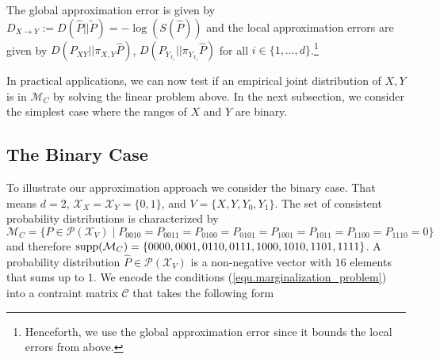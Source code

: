 \documentclass[letterpaper]{article}
\newcommand{\kC}{\mathcal{C}}   %
\newcommand{\kM}{\mathcal{M}}   %
\newcommand{\kP}{\mathcal{P}}   %
\newcommand{\kX}{\mathcal{X}}   %
\newcommand{\supp}{{\rm supp}}
\begin{document}
The global approximation error is given by $D_{X \rightarrow Y} := D(\hat P || \tilde P) = -\log(S(\hat P))$ and the local approximation errors are given by $D(P_{XY} || \pi_{X,Y} \hat P)$, $D(P_{Y_{x_i}} || \pi_{Y_{x_i}} \hat P)$ for all $i \in \{1, \ldots, d\}$.\footnote{Henceforth, we use the global approximation error since it bounds the local errors from above.}

In practical applications, we can now test if an empirical joint distribution of $X, Y$ is in $\kM_C$ by solving the linear problem above. In the next subsection, we consider the simplest case where the ranges of $X$ and $Y$ are binary.

\subsection{The Binary Case} \label{sec.binary_case}

To illustrate our approximation approach we consider the binary case. That means $d=2$, $\kX_X = \kX_Y = \{0,1\}$, and $V=\{X,Y,Y_0, Y_1\}$. The set of consistent probability distributions is characterized by $$
\kM_C=\{P \in \kP(\kX_V) \;|\; P_{0010} = P_{0011} = P_{0100} = P_{0101} = P_{1001} = P_{1011} = P_{1100} = P_{1110} = 0\}
$$ 
and therefore $\supp(\kM_C) = \{0000, 0001, 0110, 0111, 1000, 1010, 1101, 1111 \}$. A probability distribution $\hat P \in \kP(\kX_V)$ is a non-negative vector with $16$ elements that sums up to $1$. We encode the conditions (\ref{equ.marginalization_problem}) into a contraint matrix $\kC$ that takes the following form
\end{document}
